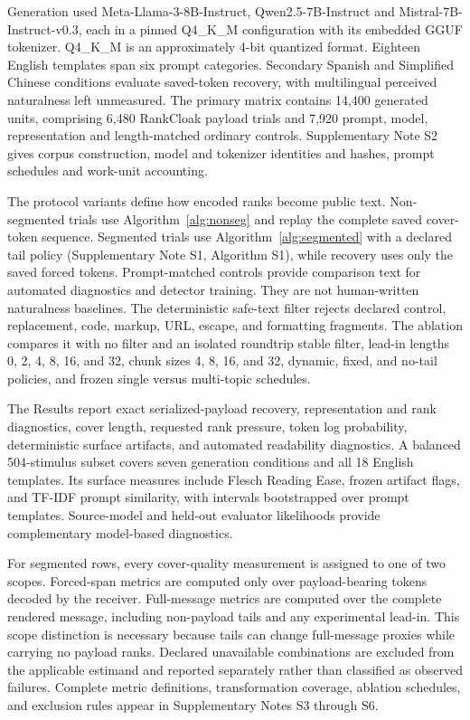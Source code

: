 \documentclass[fleqn,10pt]{wlscirep}
\begin{document}
Generation used Meta-Llama-3-8B-Instruct, Qwen2.5-7B-Instruct and Mistral-7B-Instruct-v0.3, each in a pinned Q4\_K\_M configuration with its embedded GGUF tokenizer. Q4\_K\_M is an approximately 4-bit quantized format. Eighteen English templates span six prompt categories. Secondary Spanish and Simplified Chinese conditions evaluate saved-token recovery, with multilingual perceived naturalness left unmeasured. The primary matrix contains 14,400 generated units, comprising 6,480 RankCloak payload trials and 7,920 prompt, model, representation and length-matched ordinary controls. Supplementary Note S2 gives corpus construction, model and tokenizer identities and hashes, prompt schedules and work-unit accounting.

The protocol variants define how encoded ranks become public text. Non-segmented trials use Algorithm~\ref{alg:nonseg} and replay the complete saved cover-token sequence. Segmented trials use Algorithm~\ref{alg:segmented} with a declared tail policy (Supplementary Note S1, Algorithm S1), while recovery uses only the saved forced tokens. Prompt-matched controls provide comparison text for automated diagnostics and detector training. They are not human-written naturalness baselines. The deterministic safe-text filter rejects declared control, replacement, code, markup, URL, escape, and formatting fragments. The ablation compares it with no filter and an isolated roundtrip stable filter, lead-in lengths 0, 2, 4, 8, 16, and 32, chunk sizes 4, 8, 16, and 32, dynamic, fixed, and no-tail policies, and frozen single versus multi-topic schedules.

The Results report exact serialized-payload recovery, representation and rank diagnostics, cover length, requested rank pressure, token log probability, deterministic surface artifacts, and automated readability diagnostics. A balanced 504-stimulus subset covers seven generation conditions and all 18 English templates. Its surface measures include Flesch Reading Ease\cite{Flesch1948Readability}, frozen artifact flags, and TF-IDF prompt similarity, with intervals bootstrapped over prompt templates. Source-model and held-out evaluator likelihoods provide complementary model-based diagnostics.

For segmented rows, every cover-quality measurement is assigned to one of two scopes. Forced-span metrics are computed only over payload-bearing tokens decoded by the receiver. Full-message metrics are computed over the complete rendered message, including non-payload tails and any experimental lead-in. This scope distinction is necessary because tails can change full-message proxies while carrying no payload ranks. Declared unavailable combinations are excluded from the applicable estimand and reported separately rather than classified as observed failures. Complete metric definitions, transformation coverage, ablation schedules, and exclusion rules appear in Supplementary Notes S3 through S6.
\end{document}
